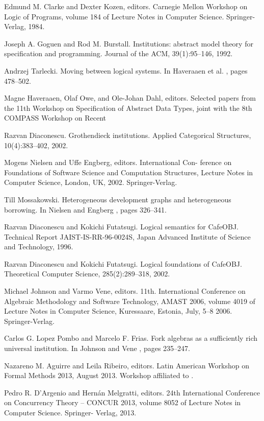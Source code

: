 \begin{thebibliography}{tesis}
 Edmund M. Clarke and Dexter Kozen, editors. Carnegie Mellon Workshop on Logic of Programs, volume 184 of Lecture Notes in Computer Science. Springer-Verlag, 1984. 

 Joseph A. Goguen and Rod M. Burstall. Institutions: abstract model theory for specification and programming. Journal of the ACM, 39(1):95–146, 1992. 

 Andrzej Tarlecki. Moving between logical systems. In Haveraaen et al. \cite{HOD96}, pages 478–502.

 Magne Haveraaen, Olaf Owe, and Ole-Johan Dahl, editors. Selected papers from the 11th Workshop on Specification of Abstract Data Types, joint with the 8th COMPASS Workshop on Recent

 Razvan Diaconescu. Grothendieck institutions. Applied Categorical Structures, 10(4):383–402, 2002.

 Mogens Nielsen and Uffe Engberg, editors. International Con- ference on Foundations of Software Science and Computation Structures, Lecture Notes in Computer Science, London, UK, 2002. Springer-Verlag.

 Till Mossakowski. Heterogeneous development graphs and heterogeneous borrowing. In Nielsen and Engberg \cite{NE02}, pages 326–341. 

 Razvan Diaconescu and Kokichi Futatsugi. Logical semantics for CafeOBJ. Technical Report JAIST-IS-RR-96-0024S, Japan Advanced Institute of Science and Technology, 1996. 

 Razvan Diaconescu and Kokichi Futatsugi. Logical foundations of CafeOBJ. Theoretical Computer Science, 285(2):289–318, 2002. 

  Michael Johnson and Varmo Vene, editors. 11th. International Conference on Algebraic Methodology and Software Technology, AMAST 2006, volume 4019 of Lecture Notes in Computer Science, Kuressaare, Estonia, July, 5–8 2006. Springer-Verlag. 

 Carlos G. Lopez Pombo and Marcelo F. Frias. Fork algebras as a sufficiently rich universal institution. In Johnson and Vene \cite{JV06}, pages 235–247. 

 Nazareno M. Aguirre and Leila Ribeiro, editors. Latin American Workshop on Formal Methods 2013, August 2013. Workshop affiliated to \cite{DM13}. 

 Pedro R. D’Argenio and Hernán Melgratti, editors. 24th International Conference on Concurrency Theory – CONCUR 2013, volume 8052 of Lecture Notes in Computer Science. Springer- Verlag, 2013.


\end{thebibliography}
